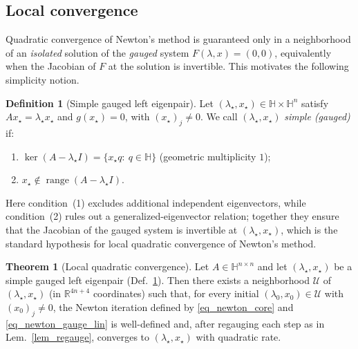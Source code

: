 \documentclass[preprint,12pt]{elsarticle}  %
\theoremstyle{definition}
\newtheorem{Def}{Definition}
\theoremstyle{definition}
\newtheorem{The}{Theorem}
\theoremstyle{definition}
\theoremstyle{definition}
\theoremstyle{definition}
\theoremstyle{remark}
\theoremstyle{remark}
\theoremstyle{remark}
\newcommand{\RR}{\mathbb{R}}
\newcommand{\HH}{\mathbb{H}}
\DeclareMathOperator{\Range}{range}
\begin{document}
\subsection{Local convergence}
\label{subsec_newton_convergence}
Quadratic convergence of Newton's method is guaranteed only in a neighborhood of an \emph{isolated} solution of the \emph{gauged} system $F(\lambda,x)=(0,0)$, equivalently when the Jacobian of $F$ at the solution is invertible.
This motivates the following simplicity notion.

\begin{Def}[Simple gauged left eigenpair]
\label{def_simple_gauged_left_eig}
Let $(\lambda_\star,x_\star)\in\HH\times\HH^n$ satisfy $Ax_\star=\lambda_\star x_\star$ and $g(x_\star)=0$,
with $(x_\star)_j\neq 0$.
We call $(\lambda_\star,x_\star)$ \emph{simple (gauged)} if:
\begin{enumerate}
\item $\ker(A-\lambda_\star I)=\{x_\star q:\ q\in\HH\}$ (geometric multiplicity $1$);
\item $x_\star\notin \Range(A-\lambda_\star I)$.
\end{enumerate}
\end{Def}

\noindent
Here condition~(1) excludes additional independent eigenvectors, while condition~(2) rules out a
generalized-eigenvector relation; together they ensure that the Jacobian of the gauged system is invertible at
$(\lambda_\star,x_\star)$, which is the standard hypothesis for local quadratic convergence of Newton's method.


\begin{The}[Local quadratic convergence]
\label{th_newton_left_eigs}
Let $A\in\HH^{n\times n}$ and let $(\lambda_\star,x_\star)$ be a simple gauged left eigenpair
(Def.~\ref{def_simple_gauged_left_eig}). Then there exists a neighborhood $\mathcal U$ of $(\lambda_\star,x_\star)$
(in $\RR^{4n+4}$ coordinates) such that, for every initial $(\lambda_0,x_0)\in\mathcal U$ with $(x_0)_j\neq 0$,
the Newton iteration defined by \eqref{eq_newton_core} and \eqref{eq_newton_gauge_lin} is well-defined and,
after regauging each step as in Lem.~\ref{lem_regauge}, converges to $(\lambda_\star,x_\star)$ with quadratic rate.
\end{The}
\end{document}
